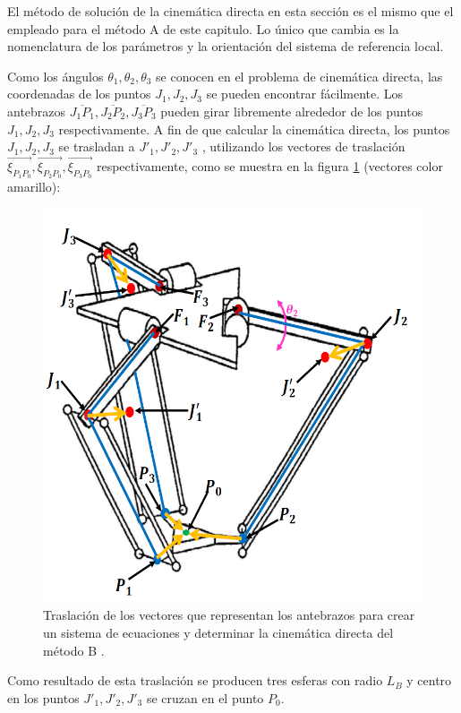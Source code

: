         El método de solución de la cinemática directa en esta sección es el mismo que el empleado para el método A de este capitulo. Lo único que cambia es la nomenclatura de los parámetros y la orientación del sistema de referencia local.
        
        Como los ángulos   $\theta_1,\theta_2,\theta_3$  se conocen en el problema de cinemática directa, las coordenadas de los puntos $J_1,J_2,J_3$   se pueden encontrar fácilmente. Los antebrazos   $\overline{J_1P_1},\overline{J_2P_2},\overline{J_3P_3}$   pueden girar libremente alrededor de los puntos $J_1,J_2,J_3$   respectivamente. A fin de que calcular la cinemática directa, los puntos  $J_1,J_2,J_3$   se trasladan a  $J'_1,J'_2,J'_3$ , utilizando los vectores de traslación $\overrightarrow{\xi_{P_1 P_0}},\overrightarrow{\xi_{P_2P_0}},\overrightarrow{\xi_{P_3 P_0}}$    respectivamente, como se muestra en la figura \ref{f:Cap4_Metodo_B_Modelacion_Cinematica_Posicion_3} (vectores color amarillo):
        
            \begin{figure}[htb]
                 \centering
               \includegraphics[width=0.7\linewidth]{Main/Chapter4/Images4/DIBUJO28.png}
                  \caption{Traslación de los vectores que representan los antebrazos para crear un sistema de ecuaciones y determinar la cinemática directa del método B \cite{Path_Planning_and_Trajectory_Optimization}.}
                  \label{f:Cap4_Metodo_B_Modelacion_Cinematica_Posicion_3}
            \end{figure}        

        Como resultado de esta traslación se producen tres esferas con radio $L_B$ y centro en los puntos $J'_1,J'_2,J'_3$  se cruzan en el punto $P_0$.




